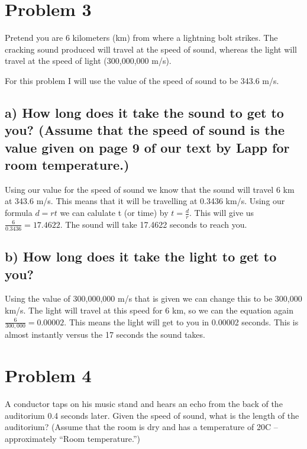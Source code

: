 \documentclass[]{article}
\begin{document}
\section{Problem 3}\label{problem-3}

Pretend you are 6 kilometers (km) from where a lightning bolt strikes.
The cracking sound produced will travel at the speed of sound, whereas
the light will travel at the speed of light (300,000,000 m/s).

For this problem I will use the value of the speed of sound to be 343.6
m/s.

\subsection{a) How long does it take the sound to get to you? (Assume
that the speed of sound is the value given on page 9 of our text by Lapp
for room
temperature.)}\label{a-how-long-does-it-take-the-sound-to-get-to-you-assume-that-the-speed-of-sound-is-the-value-given-on-page-9-of-our-text-by-lapp-for-room-temperature.}

Using our value for the speed of sound we know that the sound will
travel 6 km at 343.6 m/s. This means that it will be travelling at
0.3436 km/s. Using our formula \(d = rt\) we can calulate t (or time) by
\(t = \frac{d}{r}\). This will give us \(\frac6{0.3436} = 17.4622\). The
sound will take 17.4622 seconds to reach you.

\subsection{b) How long does it take the light to get to
you?}\label{b-how-long-does-it-take-the-light-to-get-to-you}

Using the value of 300,000,000 m/s that is given we can change this to
be 300,000 km/s. The light will travel at this speed for 6 km, so we can
the equation again \(\frac6{300,000} = 0.00002\). This means the light
will get to you in 0.00002 seconds. This is almost instantly versus the
17 seconds the sound takes.

\section{Problem 4}\label{problem-4}

A conductor taps on his music stand and hears an echo from the back of
the auditorium 0.4 seconds later. Given the speed of sound, what is the
length of the auditorium? (Assume that the room is dry and has a
temperature of 20C -- approximately ``Room temperature.'')
\end{document}
